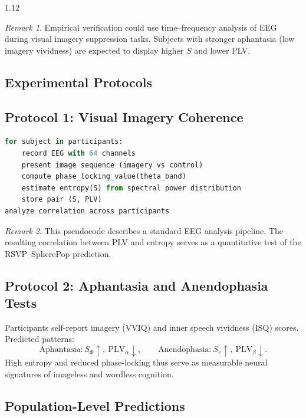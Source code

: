 \documentclass[12pt,a4paper]{article}
\numberwithin{equation}{section}
\theoremstyle{remark}
\newtheorem{remark}{Remark}[section]
\theoremstyle{definition}
\begin{document}
\begin{spacing}{1.12}
\begin{remark}
Empirical verification could use time–frequency analysis of EEG during visual imagery suppression tasks.  
Subjects with stronger aphantasia (low imagery vividness) are expected to display higher $S$ and lower PLV.
\end{remark}

\subsection{Experimental Protocols}\label{sec:H-protocol}

\subsection{Protocol 1: Visual Imagery Coherence}

\begin{lstlisting}[language=Python,caption={Formal pseudocode for PLV measurement protocol}]
for subject in participants:
    record EEG with 64 channels
    present image sequence (imagery vs control)
    compute phase_locking_value(theta_band)
    estimate entropy(S) from spectral power distribution
    store pair (S, PLV)
analyze correlation across participants
\end{lstlisting}

\begin{remark}
This pseudocode describes a standard EEG analysis pipeline.  
The resulting correlation between PLV and entropy serves as a quantitative test of the RSVP–SpherePop prediction.
\end{remark}

\subsection{Protocol 2: Aphantasia and Anendophasia Tests}

Participants self-report imagery (VVIQ) and inner speech vividness (ISQ) scores.  
Predicted patterns:
\[
\text{Aphantasia:}\ S_\Phi \uparrow,\ \text{PLV}_\alpha \downarrow, \qquad
\text{Anendophasia:}\ S_v \uparrow,\ \text{PLV}_\beta \downarrow.
\]
High entropy and reduced phase-locking thus serve as measurable neural signatures of imageless and wordless cognition.

\subsection{Population-Level Predictions}\label{sec:H-population}


\end{spacing}
\end{document}
